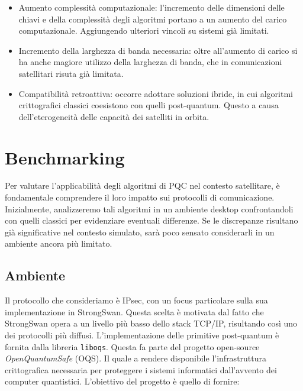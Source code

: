\begin{itemize}
    \item  Aumento complessità computazionale: l'incremento delle dimensioni delle chiavi e della complessità degli algoritmi portano a un aumento del carico computazionale. Aggiungendo ulteriori vincoli su sistemi già limitati. 
    \item Incremento della larghezza di banda necessaria: oltre all'aumento di carico si ha anche magiore utilizzo della larghezza di banda, che in comunicazioni satellitari risuta già limitata.
    \item Compatibilità retroattiva: occorre adottare soluzioni ibride, in cui
    algo\-ritmi crittografici classici coesistono con quelli post-quantum. Questo a 
    causa dell'eterogeneità delle capacità dei satelliti in orbita.
\end{itemize}

\section{Benchmarking}

Per valutare l'applicabilità degli algoritmi di PQC
nel contesto satellitare, è fondamentale comprendere il loro impatto sui
protocolli di comunicazione. Inizialmente, analizzeremo tali algoritmi in un
ambiente desktop confrontan\-doli con quelli classici per evidenziare eventuali
differenze. Se le discrepanze risultano già significative nel contesto simulato,
sarà poco sensato considerarli in un ambiente ancora più limitato.


\subsection{Ambiente}

Il protocollo che consideriamo è IPsec, con un focus particolare sulla sua
implementazione in StrongSwan. Questa scelta è motivata dal fatto che StrongSwan
opera a un livello più basso dello stack TCP/IP, risultando così uno dei
protocolli più diffusi. L'implementazione delle primitive post-quantum è fornita dalla libreria \texttt{liboqs}. 
Questa fa parte del progetto open-source \textit{OpenQuantumSafe} (OQS).
Il quale a rendere disponibile l'infrastruttura crittografica necessaria per proteggere i sistemi informatici
dall'avvento dei computer quantistici. L'obiet\-tivo del progetto è quello di fornire:

